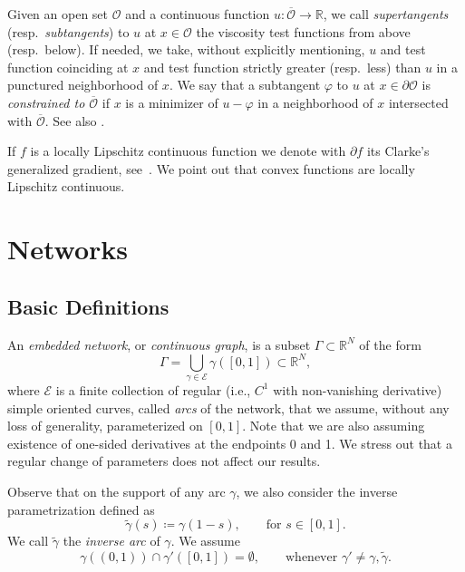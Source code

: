 \documentclass[11pt,a4paper,american]{article}
\newcommand{\Ecal}{\mathcal E}
\newcommand{\Rds}{\mathds R}
\begin{document}
    Given an open set $\mathcal O$ and a continuous function $u:\overline{\mathcal O}\to\Rds$, we call \emph{supertangents} (resp.\ \emph{subtangents}) to $u$ at $x\in\mathcal O$ the viscosity test functions from above (resp.\ below). If needed, we take, without explicitly mentioning, $u$ and test function coinciding at $x$ and test function strictly greater (resp.\ less) than $u$ in a punctured neighborhood of $x$. We say that a subtangent $\varphi$ to $u$ at $x\in\partial\mathcal O$ is \emph{constrained to $\overline{\mathcal O}$} if $x$ is a minimizer of $u-\varphi$ in a neighborhood of $x$ intersected with $\overline{\mathcal O}$. See also \cite[Definition 3.4]{SiconolfiSorrentino18}.

    If $f$ is a locally Lipschitz continuous function we denote with $\partial f$ its Clarke's generalized gradient, see~\cite{Clarke90,ClarkeLedyaevSternWolenski98}. We point out that convex functions are locally Lipschitz continuous.

    \section{Networks}\label{netsec}

    \subsection{Basic Definitions}

    An \emph{embedded network}, or \emph{continuous graph}, is a subset $\Gamma\subset\Rds^N$ of the form
    \begin{equation*}
        \Gamma=\bigcup_{\gamma\in\Ecal}\gamma([0,1])\subset\Rds^N,
    \end{equation*}
    where $\Ecal$ is a finite collection of regular (i.e., $C^1$ with non-vanishing derivative) simple oriented curves, called \emph{arcs} of the network, that we assume, without any loss of generality, parameterized on $[0,1]$. Note that we are also assuming existence of one-sided derivatives at the endpoints 0 and 1. We stress out that a regular change of parameters does not affect our results.

    Observe that on the support of any arc $\gamma$, we also consider the inverse parametrization defined as
    \begin{equation*}
        \widetilde\gamma(s)\coloneqq\gamma(1-s),\qquad\text{for }s\in[0,1].
    \end{equation*}
    We call $\widetilde\gamma$ the \emph{inverse arc} of $\gamma$. We assume
    \begin{equation}\label{eq:nosovrap}
        \gamma((0,1))\cap\gamma'([0,1])=\emptyset,\qquad\text{whenever }\gamma'\ne\gamma,\widetilde\gamma.
    \end{equation}
\end{document}
